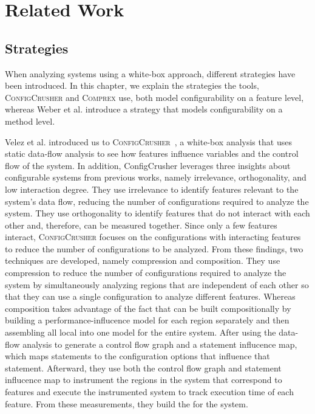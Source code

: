 \chapter{Related Work}\label{ch:relatedwork}

\section{Strategies}\label{analyzing-strats}
When analyzing systems using a white-box approach, different strategies have been introduced. 
In this chapter, we explain the strategies the tools, \textsc{ConfigCrusher} and \textsc{Comprex} use, 
both model configurability on a feature level, whereas Weber et al. introduce a strategy that models configurability on a method level.

Velez et al. introduced us to \textsc{ConfigCrusher}~\cite{ConfigCrusher}, 
a white-box analysis that uses static data-flow analysis to see how features influence variables and the control flow of the system. 
In addition, ConfigCrusher leverages three insights about configurable systems from previous works, namely irrelevance, orthogonality, 
and low interaction degree. They use irrelevance to identify features relevant to the system's data flow, 
reducing the number of configurations required to analyze the system. They use orthogonality to identify features that do not interact with each other and, 
therefore, can be measured together. Since only a few features interact, 
\textsc{ConfigCrusher} focuses on the configurations with interacting features to reduce the number of configurations to be analyzed. 
From these findings, two techniques are developed, namely compression and composition. 
They use compression to reduce the number of configurations required to analyze the system by simultaneously analyzing regions that are independent of each other 
so that they can use a single configuration to analyze different features. 
Whereas composition takes advantage of the fact that {\perfInfluenceModel} can be built compositionally by building a performance-influcence model 
for each region separately and then assembling all local {\perfInfluenceModel} into one model for the entire system.
After using the data-flow analysis to generate a control flow graph and a statement influcence map, which maps statements to the configuration options 
that influence that statement.
Afterward, they use both the control flow graph and statement influcence map to instrument the regions in the system that correspond to features and execute
the instrumented system to track execution time of each feature. From these measurements, they build the {\perfInfluenceModel} for the system.

